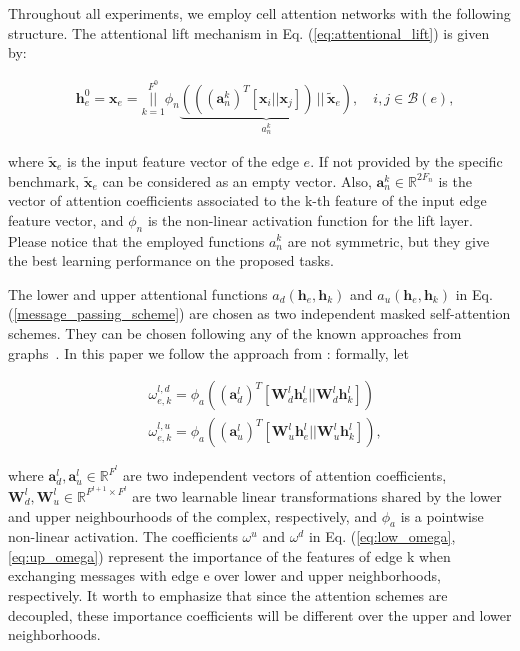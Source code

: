 \documentclass{article}
\begin{document}
Throughout all experiments, we employ cell attention networks with the following structure. The attentional lift mechanism in Eq. (\ref{eq:attentional_lift}) is given by:

\begin{align}
    &\mathbf{h}_{e}^0 = \mathbf{x}_e = \overset{F^0}{\underset{k=1}{||}}\phi_n \underbrace{\left( \left(  \left(\mathbf{a}_{n}^{k} \right)^T [\mathbf{x}_i \vert \vert \mathbf{x}_j] \right) \, \big\vert \big\vert \, \tilde{\mathbf{x}}_e \right)}_{a_n^k}, \quad  i,j \in \mathcal{B}(e),
\end{align}


where $\tilde{\mathbf{x}}_e$ is the input feature vector of the edge $e$. If not provided by the specific benchmark, $\tilde{\mathbf{x}}_e$ can be considered as an empty vector. Also, $\mathbf{a}_n^k \in \mathbb{R}^{2F_n}$ is the vector of attention coefficients associated to the k-th feature of the input edge feature vector, and $\phi_n$ is the non-linear activation function for the lift layer. Please notice that the employed functions $a_n^k$ are not symmetric, but they give the best learning performance on the proposed tasks.

The lower and upper attentional  functions $a_d(\mathbf{h}_{e},\mathbf{h}_{k})$ and $a_u(\mathbf{h}_{e},\mathbf{h}_{k})$ in Eq. (\ref{message_passing_scheme}) are chosen as two independent masked self-attention schemes. They can be chosen following any of the known approaches from graphs~\cite{velivckovic2017graph, brody2021attentive}. In this paper we follow the approach from \cite{velivckovic2017graph}: formally, let

\begin{align}
    &\omega_{e,k}^{l,d} =  \phi_a \left( (\mathbf{a}_{d}^l)^T \left[ \mathbf{W}_{d}^{l}  \mathbf{h}_{e}^{l}  \vert \vert   \mathbf{W}_{d}^{l} \mathbf{h}_{k}^{l}  \right] \right)\label{eq:low_omega} \\
    &\omega_{e,k}^{l,u} = \phi_a \left( (\mathbf{a}_{u}^l)^T \left[ \mathbf{W}_{u}^{l}  \mathbf{h}_{e}^{l}  \vert \vert   \mathbf{W}_{u}^{l} \mathbf{h}_{k}^{l}  \right] \right), \label{eq:up_omega}
\end{align}


where $\mathbf{a}_{d}^l, \mathbf{a}_{u}^l \in \mathbb{R}^{F^{l}}$ are two independent vectors of attention coefficients, $\mathbf{W}_{d}^l, \mathbf{W}_{u}^l \in \mathbb{R}^{F^{l+1} \times F^{l}}$ are two learnable linear transformations shared by the lower and upper neighbourhoods of the complex, respectively, and $\phi_a$ is a pointwise non-linear activation. The coefficients $\omega^u$ and $\omega^d$ in Eq. (\ref{eq:low_omega},\ref{eq:up_omega}) represent the importance of the features of edge k when exchanging messages with edge e over lower and upper neighborhoods, respectively. It worth to emphasize that since the attention schemes are decoupled, these importance coefficients will be different over the upper and lower neighborhoods. 
\end{document}
